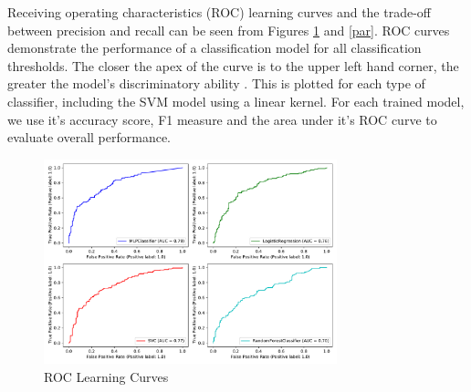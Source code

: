 \begin{table}[H]
\caption{Model performance comparing validation and test sets}
\label{results}
\centering
\setlength{\tabcolsep}{3pt}
\end{table}

Receiving operating characteristics (ROC) learning curves and the trade-off between precision and recall can be seen from Figures \ref{roc} and \ref{par}. ROC curves demonstrate the performance of a classification model for all classification thresholds. The closer the apex of the curve is to the upper left hand corner, the greater the model's discriminatory ability \cite{fan2006understanding}. This is plotted for each type of classifier, including the SVM model using a linear kernel. 
For each trained model, we use it's accuracy score, F1 measure and the area under it's ROC curve to evaluate overall performance.

\begin{figure}[ht]
\includegraphics[width=8.5cm]{plots/roccurves.pdf}
\caption{ROC Learning Curves}

\label{roc}
\centering
\end{figure}

